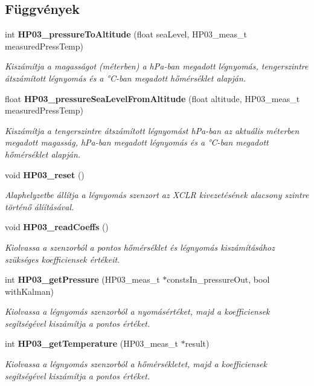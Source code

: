 \subsection*{Függvények}
\begin{DoxyCompactItemize}
\item 
int {\bf H\-P03\-\_\-pressure\-To\-Altitude} (float sea\-Level, H\-P03\-\_\-meas\-\_\-t measured\-Press\-Temp)
\begin{DoxyCompactList}\small\item\em Kiszámítja a magasságot (méterben) a h\-Pa-\/ban megadott légnyomás, tengerszintre átszámított légnyomás és a °\-C-\/ban megadott hőmérséklet alapján. \end{DoxyCompactList}\item 
float {\bf H\-P03\-\_\-pressure\-Sea\-Level\-From\-Altitude} (float altitude, H\-P03\-\_\-meas\-\_\-t measured\-Press\-Temp)
\begin{DoxyCompactList}\small\item\em Kiszámítja a tengerszintre átszámított légnyomást h\-Pa-\/ban az aktuális méterben megadott magasság, h\-Pa-\/ban megadott légnyomás és a °\-C-\/ban megadott hőmérséklet alapján. \end{DoxyCompactList}\item 
void {\bf H\-P03\-\_\-reset} ()
\begin{DoxyCompactList}\small\item\em Alaphelyzetbe állítja a légnyomás szenzort az X\-C\-L\-R kivezetésének alacsony szintre történő álíításával. \end{DoxyCompactList}\item 
void {\bf H\-P03\-\_\-read\-Coeffs} ()
\begin{DoxyCompactList}\small\item\em Kiolvassa a szenzorból a pontos hőmérséklet és légnyomás kiszámításához szükséges koefficiensek értékeit. \end{DoxyCompactList}\item 
int {\bf H\-P03\-\_\-get\-Pressure} (H\-P03\-\_\-meas\-\_\-t $\ast$consts\-In\-\_\-pressure\-Out, bool with\-Kalman)
\begin{DoxyCompactList}\small\item\em Kiolvassa a légnyomás szenzorból a nyomásértéket, majd a koefficiensek segítségével kiszámítja a pontos értéket. \end{DoxyCompactList}\item 
int {\bf H\-P03\-\_\-get\-Temperature} (H\-P03\-\_\-meas\-\_\-t $\ast$result)
\begin{DoxyCompactList}\small\item\em Kiolvassa a légnyomás szenzorból a hőmérsékletet, majd a koefficiensek segítségével kiszámítja a pontos értéket. \end{DoxyCompactList}\end{DoxyCompactItemize}



